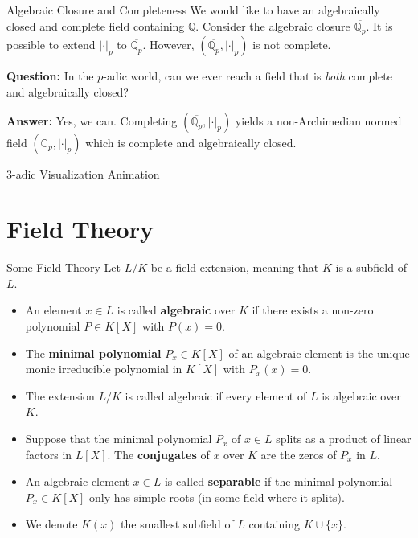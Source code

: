 \documentclass{beamer}
\newcommand{\Q}{\mathbb{Q}}
\newcommand{\C}{\mathbb{C}}
\begin{document}
\begin{frame}{Algebraic Closure and Completeness}
    We would like to have an algebraically closed and complete field containing $\Q$.
    Consider the algebraic closure $\overline{\Q_p}$. It is possible to extend 
    $|\cdot|_p$ to $\overline{\Q_p}$. \pause However, $(\overline{\Q_p}, |\cdot|_p)$ is 
    not complete. \pause 

    \bigskip 
    \textbf{Question:} In the $p$-adic world, can we ever reach a field that is \emph{both} complete and algebraically closed? 
    \pause 

    \bigskip
    \textbf{Answer:} Yes, we can. Completing $(\overline{\Q_p}, |\cdot|_p)$ yields a non-Archimedian normed
    field $(\C_p, |\cdot|_p)$ which is complete and algebraically closed.
\end{frame}
\begin{frame}{3-adic Visualization Animation}

\end{frame}

\section{Field Theory}
\begin{frame}{Some Field Theory}
    Let $L/K$ be a field extension, meaning that $K$ is a subfield of $L$.
    \pause
    \begin{itemize}
        \item An element $x \in L$ is called \textbf{algebraic} over $K$ if there exists a non-zero polynomial $P \in K[X]$ with $P(x) = 0$.
        \pause 
        \item The \textbf{minimal polynomial} $P_x \in K[X]$ of an algebraic element is the unique monic irreducible polynomial in $K[X]$ with $P_x(x) = 0$.
        \pause
        \item The extension $L/K$ is called algebraic if every element of $L$ is algebraic over $K$.
        \pause 
        \item Suppose that the minimal polynomial $P_x$ of $x \in L$ splits as a product of linear factors in $L[X]$. The \textbf{conjugates} of $x$ over $K$ are the zeros of $P_x$ in $L$.
        \pause 
        \item An algebraic element $x \in L$ is called \textbf{separable} if the minimal polynomial $P_x \in K[X]$ only has simple roots (in some field where it splits).
        \pause 
        \item We denote $K(x)$ the smallest subfield of $L$ containing $K \cup \{x\}$.
    \end{itemize}
\end{frame}
\end{document}
